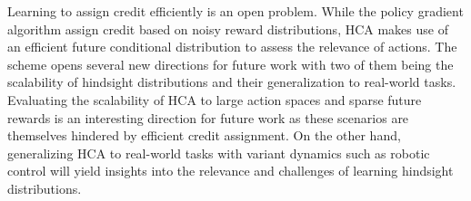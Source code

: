 \documentclass[11pt,letterpaper]{article}
\begin{document}
Learning to assign credit efficiently is an open problem. While the policy gradient algorithm assign credit based on noisy reward distributions, HCA makes use of an efficient future conditional distribution to assess the relevance of actions. The scheme opens several new directions for future work with two of them being the scalability of hindsight distributions and their generalization to real-world tasks. Evaluating the scalability of HCA to large action spaces and sparse future rewards is an interesting direction for future work as these scenarios are themselves hindered by efficient credit assignment. On the other hand, generalizing HCA to real-world tasks with variant dynamics such as robotic control will yield insights into the relevance and challenges of learning hindsight distributions. 
\end{document}
